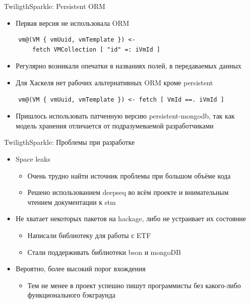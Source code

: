 \documentclass[10pt]{beamer}
\begin{document}
\begin{frame}[fragile]{TwiligthSparkle: Persistent ORM}
  \begin{itemize}
    \item Первая версия не использовала ORM
  \end{itemize}
  \begin{verbatim}
    vm@(VM { vmUuid, vmTemplate }) <-
        fetch VMCollection [ "id" =: iVmId ]
  \end{verbatim}
  \begin{itemize}
    \item Регулярно возникали опечатки в названиях полей, в передаваемых данных
    \item Для Хаскеля нет рабочих альтернативных ORM кроме persistent
  \end{itemize}
  \begin{verbatim}
    vm@(VM { vmUuid, vmTemplate }) <- fetch [ VmId ==. iVmId ]
  \end{verbatim}
  \begin{itemize}
    \item Пришлось использовать патченную версию persistent-mongodb, так как
    модель хранения отличается от подразумеваемой разработчиками
  \end{itemize}
\end{frame}

\begin{frame}{TwiligthSparkle: Проблемы при разработке}
  \begin{itemize}
    \item Space leaks
    \begin{itemize}
      \item Очень трудно найти источник проблемы при большом объёме кода
      \item Решено использованием deepseq во всём проекте и внимательным
      чтением документации к stm
    \end{itemize}
    \item Не хватает некоторых пакетов на hackage, либо не устраивает их состояние
    \begin{itemize}
      \item Написали библиотеку для работы с ETF
      \item Стали поддерживать библиотеки bson и mongoDB
    \end{itemize}
    \item Вероятно, более высокий порог вхождения
    \begin{itemize}
      \item Тем не менее в проект успешно пишут программисты без какого-либо
      функционального бэкграунда
    \end{itemize}
  \end{itemize}
\end{frame}
\end{document}
